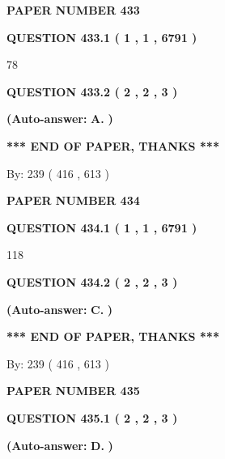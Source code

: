 \documentclass[12pt]{article}
\begin{document}
   
\newpage 
\setcounter{page}{ 
   433001 } 
   
   
 {\textbf{ \Large{ PAPER NUMBER  433  }}}
   
   
   
   
  
  
{\textbf{\large{QUESTION
433.1 
 ( 1 , 1 , 6791 )
}}}

78
  
  
{\textbf{\large{QUESTION
433.2 
 ( 2 , 2 , 3 )
}}}
 
 
{\textbf{(Auto-answer:}}
{\textbf{\large{
A.}}}
{\textbf{)}}
 
 
   
   
   
   
\vspace{1.0in} 
{\textbf{\large{ *** END OF PAPER, THANKS *** }}} 
   
   
\hspace{1.0in} By: 
 239 ( 416 ,  613 )
   
   
   
   
\newpage 
\setcounter{page}{ 
   434001 } 
   
   
 {\textbf{ \Large{ PAPER NUMBER  434  }}}
   
   
   
   
  
  
{\textbf{\large{QUESTION
434.1 
 ( 1 , 1 , 6791 )
}}}

118
  
  
{\textbf{\large{QUESTION
434.2 
 ( 2 , 2 , 3 )
}}}
 
 
{\textbf{(Auto-answer:}}
{\textbf{\large{
C.}}}
{\textbf{)}}
 
 
   
   
   
   
\vspace{1.0in} 
{\textbf{\large{ *** END OF PAPER, THANKS *** }}} 
   
   
\hspace{1.0in} By: 
 239 ( 416 ,  613 )
   
   
   
   
\newpage 
\setcounter{page}{ 
   435001 } 
   
   
 {\textbf{ \Large{ PAPER NUMBER  435  }}}
   
   
   
   
  
  
{\textbf{\large{QUESTION
435.1 
 ( 2 , 2 , 3 )
}}}
 
 
{\textbf{(Auto-answer:}}
{\textbf{\large{
D.}}}
{\textbf{)}}
 
 
  
\end{document}
